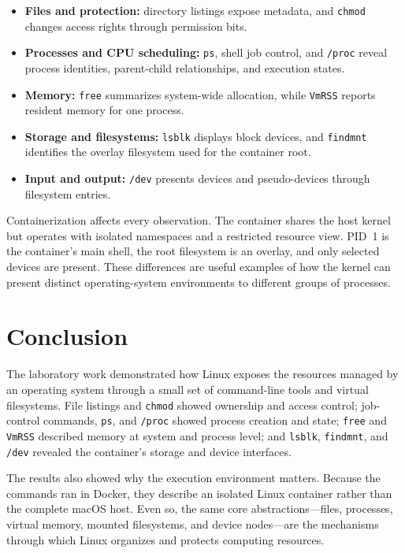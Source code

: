 \documentclass[12pt]{article}
\newcommand{\commandname}[1]{\texttt{#1}}
\begin{document}
\begin{itemize}
    \item \textbf{Files and protection:} directory listings expose metadata, and \commandname{chmod} changes access rights through permission bits.
    \item \textbf{Processes and CPU scheduling:} \commandname{ps}, shell job control, and \commandname{/proc} reveal process identities, parent-child relationships, and execution states.
    \item \textbf{Memory:} \commandname{free} summarizes system-wide allocation, while \commandname{VmRSS} reports resident memory for one process.
    \item \textbf{Storage and filesystems:} \commandname{lsblk} displays block devices, and \commandname{findmnt} identifies the overlay filesystem used for the container root.
    \item \textbf{Input and output:} \commandname{/dev} presents devices and pseudo-devices through filesystem entries.
\end{itemize}

Containerization affects every observation. The container shares the host kernel but operates with isolated namespaces and a restricted resource view. PID~1 is the container's main shell, the root filesystem is an overlay, and only selected devices are present. These differences are useful examples of how the kernel can present distinct operating-system environments to different groups of processes.

\section{Conclusion}

The laboratory work demonstrated how Linux exposes the resources managed by an operating system through a small set of command-line tools and virtual filesystems. File listings and \commandname{chmod} showed ownership and access control; job-control commands, \commandname{ps}, and \commandname{/proc} showed process creation and state; \commandname{free} and \commandname{VmRSS} described memory at system and process level; and \commandname{lsblk}, \commandname{findmnt}, and \commandname{/dev} revealed the container's storage and device interfaces.

The results also showed why the execution environment matters. Because the commands ran in Docker, they describe an isolated Linux container rather than the complete macOS host. Even so, the same core abstractions---files, processes, virtual memory, mounted filesystems, and device nodes---are the mechanisms through which Linux organizes and protects computing resources.
\end{document}
